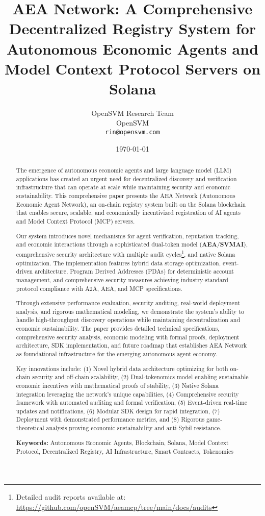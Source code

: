 \documentclass[12pt,a4paper]{article}
\title{AEA Network: A Comprehensive Decentralized Registry System for Autonomous Economic Agents and Model Context Protocol Servers on Solana}
\author{OpenSVM Research Team\\
OpenSVM\\
\texttt{rin@opensvm.com}}
\date{\today}
\begin{document}
\maketitle

\begin{abstract}
The emergence of autonomous economic agents and large language model (LLM) applications has created an urgent need for decentralized discovery and verification infrastructure that can operate at scale while maintaining security and economic sustainability. This comprehensive paper presents the AEA Network (Autonomous Economic Agent Network), an on-chain registry system built on the Solana blockchain that enables secure, scalable, and economically incentivized registration of AI agents and Model Context Protocol (MCP) servers.

Our system introduces novel mechanisms for agent verification, reputation tracking, and economic interactions through a sophisticated dual-token model (\textbf{AEA}/\textbf{SVMAI}), comprehensive security architecture with multiple audit cycles\footnote{Detailed audit reports available at: \url{https://github.com/openSVM/aeamcp/tree/main/docs/audits}}, and native Solana optimization. The implementation features hybrid data storage optimization, event-driven architecture, Program Derived Addresses (PDAs) for deterministic account management, and comprehensive security measures achieving industry-standard protocol compliance with A2A, AEA, and MCP specifications.

Through extensive performance evaluation, security auditing, real-world deployment analysis, and rigorous mathematical modeling, we demonstrate the system's ability to handle high-throughput discovery operations while maintaining decentralization and economic sustainability. The paper provides detailed technical specifications, comprehensive security analysis, economic modeling with formal proofs, deployment architecture, SDK implementation, and future roadmap that establishes AEA Network as foundational infrastructure for the emerging autonomous agent economy.

Key innovations include: (1) Novel hybrid data architecture optimizing for both on-chain security and off-chain scalability, (2) Dual-tokenomics model enabling sustainable economic incentives with mathematical proofs of stability, (3) Native Solana integration leveraging the network's unique capabilities, (4) Comprehensive security framework with automated auditing and formal verification, (5) Event-driven real-time updates and notifications, (6) Modular SDK design for rapid integration, (7) Deployment with demonstrated performance metrics, and (8) Rigorous game-theoretical analysis proving economic sustainability and anti-Sybil resistance.

\textbf{Keywords:} Autonomous Economic Agents, Blockchain, Solana, Model Context Protocol, Decentralized Registry, AI Infrastructure, Smart Contracts, Tokenomics
\end{abstract}
\end{document}
